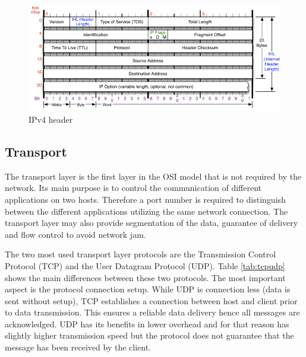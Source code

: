 \begin{figure}[b!]
    \centering
    \includegraphics[width=\textwidth]{images/theory/ip.png}
    \caption{IPv4 header \cite{ip}}
    \label{fig:ip}
\end{figure}


\subsection{Transport} 
The transport layer is the first layer in the OSI model that is not required by
the network. Its main purpose is to control the communication of different
applications on two hosts. Therefore a port number is required to distinguish
between the different applications utilizing the same network connection. The
transport layer may also provide segmentation of the data, guarantee of delivery and flow control to avoid network jam.

The two most used transport layer protocols are the Transmission Control
Protocol (TCP) and the User Datagram Protocol (UDP). Table \ref{tab:tcpudp}
shows the main differences between these two protocols. The most important
aspect is the protocol connection setup. While UDP is connection less (data is
sent without setup), TCP establishes a connection between host and client
prior to data transmission. This ensures a reliable data delivery hence all
messages are acknowledged. UDP has its benefits in lower overhead and for that
reason has slightly higher transmission speed but the protocol does not
guarantee that the message has been received by the client.

